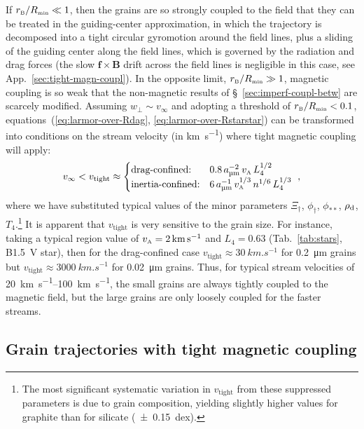If \(r_{\scriptscriptstyle\text{B}} / R_{\scriptscriptstyle\text{min}} \ll 1\), then the grains are so strongly coupled to the
field that they can be treated in the guiding-center approximation, in
which the trajectory is decomposed into a tight circular gyromotion
around the field lines, plus a sliding of the guiding center along the
field lines, which is governed by the radiation and drag forces (the
slow \(\bm{f} \times \bm{B}\) drift across the field lines is negligible in
this case, see App.~\ref{sec:tight-magn-coupl}).  In the opposite
limit, \(r_{\scriptscriptstyle\text{B}} / R_{\scriptscriptstyle\text{min}} \gg 1\), magnetic coupling is so weak that the
non-magnetic results of \S~\ref{sec:imperf-coupl-betw} are scarcely
modified.  Assuming \(w_\perp \sim v_\infty\) and adopting a threshold of
\(r_{\scriptscriptstyle\text{B}} / R_{\scriptscriptstyle\text{min}} < 0.1\), equations~(\ref{eq:larmor-over-Rdag},
\ref{eq:larmor-over-Rstarstar}) can be transformed into conditions on
the stream velocity (in \si{km.s^{-1}}) where tight magnetic coupling
will apply: \newcommand\freeze{\ensuremath{_{\text{tight}}}}
\begin{equation}
  \label{eq:velocity-strong-B-coupling}
  v_{\infty} < v\freeze \approx
  \begin{cases}
    \text{drag-confined:}
    & 0.8 \, a_{\si{\um}}^{-2} \, v\alfven \, L_4^{1/2}\\
    \text{inertia-confined:}
    & 6 \, a_{\si{\um}}^{-1} \, v\alfven^{1/3} \, n^{1/6} \, L_4^{1/3} \\
  \end{cases} \ ,
\end{equation}
where we have substituted typical values of the minor parameters
\(\Xi_\dag\), \(\phi_{\dag}\), \(\phi_{**}\), \(\rho_{\text{d}}\),
\(T_4\).\footnote{%
  The most significant systematic variation in \(v\freeze\) from these
  suppressed parameters is due to grain composition, yielding slightly
  higher values for graphite than for silicate (\SI{+-0.15}{dex}).} %
It is apparent that \(v\freeze\) is very sensitive to the grain size.
For instance, taking a typical \hii{} region value of
\(v_{\scriptscriptstyle\text{A}} = \SI{2}{km.s^{-1}}\) \citep{Arthur:2011a} and
\(L_4 = 0.63\) (Tab.~\ref{tab:stars}, B1.5~V star), then for the
drag-confined case \(v\freeze \approx \SI{30}{km.s^{-1}}\) for \SI{0.2}{\um}
grains but \(v\freeze \approx \SI{3000}{km.s^{-1}}\) for \SI{0.02}{\um}
grains. Thus, for typical stream velocities of
\SIrange{20}{100}{km.s^{-1}}, the small grains are always tightly
coupled to the magnetic field, but the large grains are only loosely
coupled for the faster streams.

\subsection{Grain trajectories with tight magnetic coupling}
\label{sec:grain-traj-with}

